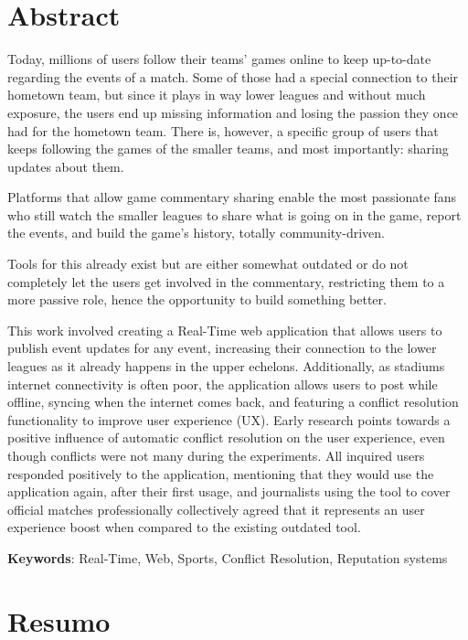 \chapter*{Abstract}

Today, millions of users follow their teams' games online to keep up-to-date regarding the events of a match. Some of those had a special connection to their hometown team, but since it plays in way lower leagues and without much exposure,  the users end up missing information and losing the passion they once had for the hometown team. There is, however,  a specific group of users that keeps following the games of the smaller teams, and most importantly: sharing updates about them. 

Platforms that allow game commentary sharing enable the most passionate fans who still watch the smaller leagues to share what is going on in the game, report the events, and build the game's history, totally community-driven. 

Tools for this already exist but are either somewhat outdated or do not completely let the users get involved in the commentary, restricting them to a more passive role, hence the opportunity to build something better. 

This work involved creating a Real-Time web application that allows users to publish event updates for any event, increasing their connection to the lower leagues as it already happens in the upper echelons. Additionally, as stadiums internet connectivity is often poor, the application allows users to post while offline, syncing when the internet comes back, and featuring a conflict resolution functionality to improve user experience (UX). Early research points towards a positive influence of automatic conflict resolution on the user experience, even though conflicts were not many during the experiments. All inquired users responded positively to the application, mentioning that they would use the application again, after their first usage, and journalists using the tool to cover official matches professionally collectively agreed that it represents an user experience boost when compared to the existing outdated tool. 


\vspace*{10mm}\noindent
\textbf{Keywords}: Real-Time, Web, Sports, Conflict Resolution, Reputation systems

\chapter*{Resumo}

